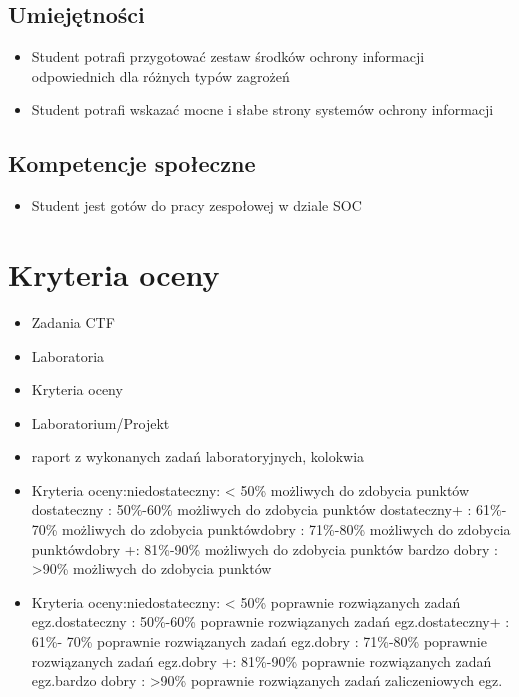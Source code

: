 \documentclass[12pt, a4paper]{article}
\begin{document}
\subsection*{Umiejętności}
\begin{itemize}
  \item Student potrafi przygotować zestaw środków ochrony informacji odpowiednich dla różnych typów zagrożeń
  \item Student potrafi wskazać mocne i słabe strony systemów ochrony informacji
\end{itemize}

\subsection*{Kompetencje społeczne}
\begin{itemize}
  \item Student jest gotów do pracy zespołowej w dziale SOC
\end{itemize}

\section{Kryteria oceny}

\begin{itemize}
  \item Zadania CTF
  \item Laboratoria
  \item Kryteria oceny
  \item Laboratorium/Projekt
  \item raport z wykonanych zadań laboratoryjnych, kolokwia
  \item Kryteria oceny:niedostateczny: < 50\% możliwych do zdobycia punktów dostateczny  :     50\%-60\% możliwych do zdobycia punktów dostateczny+ :    61\%- 70\% możliwych do zdobycia punktówdobry :                71\%-80\% możliwych do zdobycia punktówdobry +:              81\%-90\% możliwych do zdobycia punktów bardzo dobry  :   >90\%  możliwych do zdobycia punktów
  \item Kryteria oceny:niedostateczny: < 50\% poprawnie rozwiązanych zadań egz.dostateczny  :     50\%-60\% poprawnie rozwiązanych zadań egz.dostateczny+ :    61\%- 70\% poprawnie rozwiązanych zadań egz.dobry :                71\%-80\% poprawnie rozwiązanych zadań egz.dobry +:              81\%-90\% poprawnie rozwiązanych zadań egz.bardzo dobry  :   >90\%  poprawnie rozwiązanych zadań zaliczeniowych egz.
\end{itemize}
\end{document}
